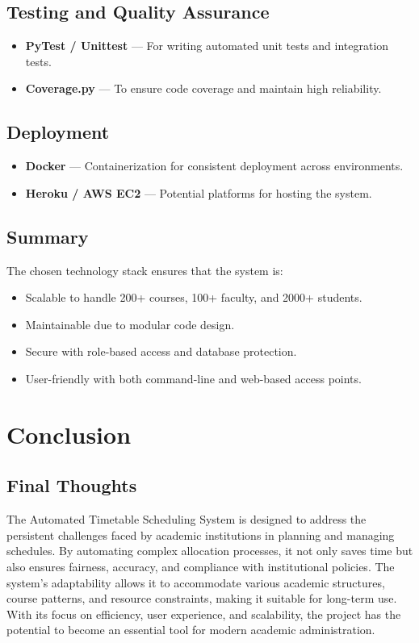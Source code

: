 \documentclass[12pt]{article}
\begin{document}
\subsection{Testing and Quality Assurance}
\begin{itemize}
    \item \textbf{PyTest / Unittest} --- For writing automated unit tests and integration tests.
    \item \textbf{Coverage.py} --- To ensure code coverage and maintain high reliability.
\end{itemize}

\subsection{Deployment}
\begin{itemize}
    \item \textbf{Docker} --- Containerization for consistent deployment across environments.
    \item \textbf{Heroku / AWS EC2} --- Potential platforms for hosting the system.
\end{itemize}

\subsection{Summary}
The chosen technology stack ensures that the system is:
\begin{itemize}
    \item Scalable to handle 200+ courses, 100+ faculty, and 2000+ students.
    \item Maintainable due to modular code design.
    \item Secure with role-based access and database protection.
    \item User-friendly with both command-line and web-based access points.
\end{itemize}

\newpage



\newpage


\section{Conclusion}
\subsection{Final Thoughts}
The Automated Timetable Scheduling System is designed to address the persistent challenges faced by academic institutions in planning and managing schedules. By automating complex allocation processes, it not only saves time but also ensures fairness, accuracy, and compliance with institutional policies. The system’s adaptability allows it to accommodate various academic structures, course patterns, and resource constraints, making it suitable for long-term use. With its focus on efficiency, user experience, and scalability, the project has the potential to become an essential tool for modern academic administration.
  
\end{document}
